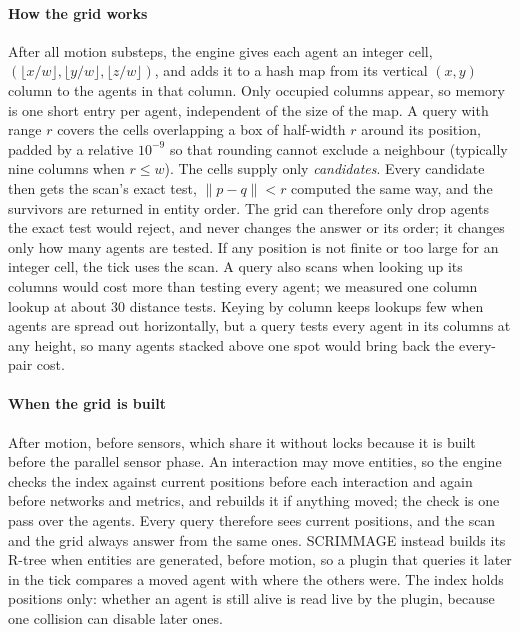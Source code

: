 \documentclass[conference]{IEEEtran}
\begin{document}
\paragraph{How the grid works}
After all motion substeps, the engine gives each agent an integer cell,
$(\lfloor x/w \rfloor, \lfloor y/w \rfloor, \lfloor z/w \rfloor)$, and adds
it to a hash map from its vertical $(x, y)$ column to the agents in that
column. Only occupied columns appear, so memory is one short entry per agent,
independent of the size of the map. A query with
range $r$ covers the cells overlapping a box of half-width $r$ around its
position, padded by a relative $10^{-9}$ so that rounding cannot exclude a
neighbour (typically nine columns when $r \le w$). The cells supply only
\emph{candidates}.
Every candidate then gets the scan's exact test, $\|p - q\| < r$
computed the same way, and the survivors are returned in entity order. The
grid can therefore only drop agents the exact test would reject, and never
changes the answer or its order; it changes only how many agents are tested.
If any position is not finite or too large for an integer cell, the tick uses
the scan. A query also scans when looking up its columns would cost more than
testing every agent; we measured one column lookup at about 30 distance tests.
Keying by column keeps lookups few when agents are spread out horizontally,
but a query tests every agent in its columns at any height, so many agents
stacked above one spot would bring back the every-pair cost.

\paragraph{When the grid is built}
After motion, before sensors, which share it without locks because it is built
before the parallel sensor phase. An interaction may move entities, so the
engine checks the index against current positions before each interaction and
again before networks and metrics, and rebuilds it if anything moved; the check
is one pass over the agents. Every query therefore sees current positions, and
the scan and the grid always answer from the same ones. SCRIMMAGE instead
builds its R-tree when entities are generated, before motion, so a plugin that
queries it later in the tick compares a moved agent with where the others
were. The index holds positions only: whether an agent is still alive is read
live by the plugin, because one collision can disable later ones.
\end{document}
